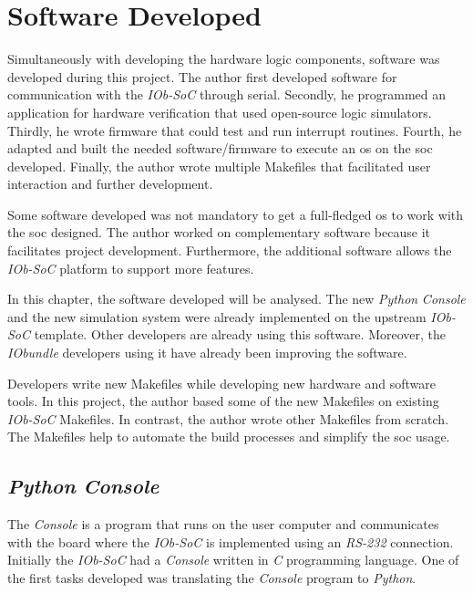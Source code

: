 \chapter{Software Developed}
\label{chapter:software_developed}
Simultaneously with developing the hardware logic components, software was developed during this project. The author first developed software for communication with the \textit{IOb-SoC} through serial. Secondly, he programmed an application for hardware verification that used open-source logic simulators. Thirdly, he wrote firmware that could test and run interrupt routines. Fourth, he adapted and built the needed software/firmware to execute an \acrlong{os} on the \acrshort{soc} developed. Finally, the author wrote multiple Makefiles that facilitated user interaction and further development.

Some software developed was not mandatory to get a full-fledged \acrlong{os} to work with the \acrlong{soc} designed. The author worked on complementary software because it facilitates project development. Furthermore, the additional software allows the \textit{IOb-SoC} platform to support more features.

In this chapter, the software developed will be analysed. The new \textit{Python} \textit{Console} and the new simulation system were already implemented on the upstream \textit{IOb-SoC} template. Other developers are already using this software. Moreover, the \textit{IObundle} developers using it have already been improving the software.

Developers write new Makefiles while developing new hardware and software tools. In this project, the author based some of the new Makefiles on existing \textit{IOb-SoC} Makefiles. In contrast, the author wrote other Makefiles from scratch. The Makefiles help to automate the build processes and simplify the \acrshort{soc} usage.

\section{\textit{Python} \textit{Console}}
\label{section:pyhton_console}
The \textit{Console} is a program that runs on the user computer and communicates with the board where the \textit{IOb-SoC} is implemented using an \textit{RS-232} connection. Initially the \textit{IOb-SoC} had a \textit{Console} written in \textit{C} programming language. One of the first tasks developed was translating the \textit{Console} program to \textit{Python}.

